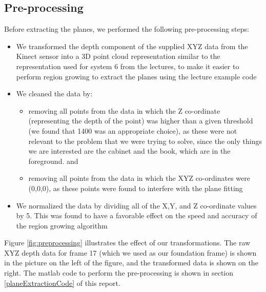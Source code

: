 \subsection{Pre-processing}
Before extracting the planes, we performed the following pre-processing steps:

\begin{itemize}
	\item We transformed the depth component of the supplied XYZ data from the Kinect sensor into a 3D point cloud representation similar to the representation used for system 6 from the lectures, to make it easier to perform region growing to extract the planes using the lecture example code
	\item We cleaned the data by:
		\begin{itemize}
			\item removing all points from the data in which the Z co-ordinate (representing the depth of the point) was higher than a given threshold (we found that 1400 was an appropriate choice), as these were not relevant to the problem that we were trying to solve, since the only things we are interested are the cabinet and the book, which are in the foreground. and
			\item removing all points from the data in which the XYZ co-ordinates were (0,0,0), as these points were found to interfere with the plane fitting
		\end{itemize}
	\item We normalized the data by dividing all of the X,Y, and Z co-ordinate values by 5. This was found to have a favorable effect on the speed and accuracy of the region growing algorithm
\end{itemize}

Figure \ref{fig:preprocessing} illustrates the effect of our transformations. The raw XYZ depth data for frame 17 (which we used as our foundation frame) is shown in the picture on the left of the figure, and the transformed data is shown on the right. The matlab code to perform the pre-processing is shown in section \ref{planeExtractionCode} of this report.


